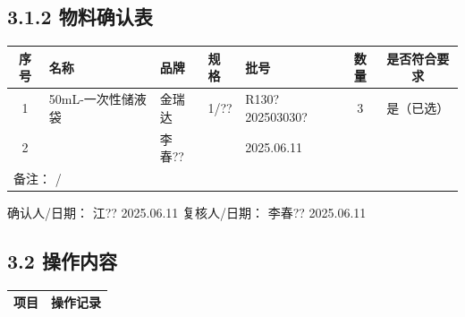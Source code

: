 \documentclass[UTF8,10pt,a4paper,fontset=fandol]{ctexart}
\newcommand{\fieldvalue}[1]{#1}
\newcommand{\handwritten}[1]{#1}
\begin{document}
\subsection*{3.1.2 物料确认表}

\small
\begin{tabularx}{\textwidth}{|c|X|X|X|X|c|c|}
\hline
序号 & 名称 & 品牌 & 规格 & 批号 & 数量 & 是否符合要求 \\
\hline
1 &
\fieldvalue{\handwritten{50mL-一次性储液袋}} &
\fieldvalue{\handwritten{金瑞达}} &
\fieldvalue{\handwritten{1/??}} &
\fieldvalue{\handwritten{R130?202503030?}} &
\fieldvalue{\handwritten{3}} &
\fieldvalue{是（已选）} \\
\hline
2 & &
\handwritten{李春??} &
& 
\handwritten{2025.06.11} &
& \\
\hline
\multicolumn{7}{|l|}{备注：%
\handwritten{/}} \\
\hline
\end{tabularx}
\normalsize

确认人/日期：
\handwritten{江??}
\quad
\handwritten{2025.06.11}
\hfill
复核人/日期：
\handwritten{李春??}
\quad
\handwritten{2025.06.11}

\subsection*{3.2 操作内容}

\begin{tabularx}{\textwidth}{|X|X|}
\hline
项目 & 操作记录 \\
\hline
\end{tabularx}

\newpage
\end{document}

